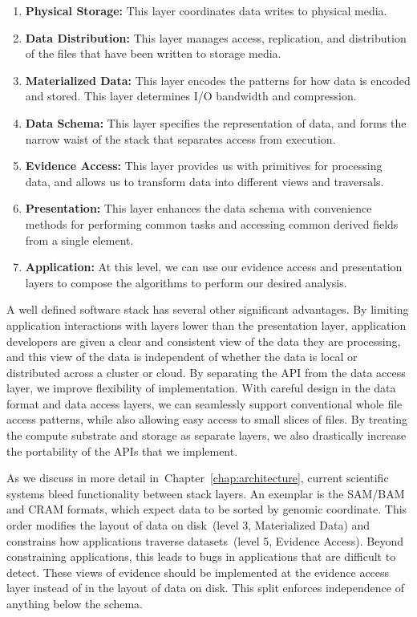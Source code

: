 \documentclass[phd]{ucbthesis}
\begin{document}
\begin{enumerate}
\item \textbf{Physical Storage:} This layer coordinates data writes to physical media.
\item \textbf{Data Distribution:} This layer manages access, replication, and distribution of the files that have
been written to storage media.
\item \textbf{Materialized Data:} This layer encodes the patterns for how data is encoded and stored. This
layer determines I/O bandwidth and compression.
\item \textbf{Data Schema:} This layer specifies the representation of data, and forms the narrow waist of
the stack that separates access from execution.
\item \textbf{Evidence Access:} This layer provides us with primitives for processing data, and allows us to
transform data into different views and traversals.
\item \textbf{Presentation:} This layer enhances the data schema with convenience methods for performing
common tasks and accessing common derived fields from a single element.
\item \textbf{Application:} At this level, we can use our evidence access and presentation layers to compose
the algorithms to perform our desired analysis.
\end{enumerate}

A well defined software stack has several other significant advantages. By limiting application
interactions with layers lower than the presentation layer, application developers are given a clear and
consistent view of the data they are processing, and this view of the data is independent of whether the
data is local or distributed across a cluster or cloud. By separating the API from the data access layer,
we improve flexibility of implementation. With careful design in the data format and data access layers, we can seamlessly
support conventional whole file access patterns, while also allowing easy access to small slices of files.
By treating the compute substrate and storage as separate layers, we also drastically increase
the portability of the APIs that we implement.

As we discuss in more detail in~Chapter~\ref{chap:architecture}, current scientific systems bleed
functionality between stack layers. An exemplar is the SAM/BAM and CRAM formats, which expect data
to be sorted by genomic coordinate. This order modifies the layout of data on disk~(level 3, Materialized Data)
and constrains how applications traverse datasets~(level 5, Evidence Access). Beyond
constraining applications, this leads to bugs in applications that are difficult to detect.
These views of evidence should be implemented at the evidence
access layer instead of in the layout of data on disk. This split enforces independence of anything below the
schema.
\end{document}
